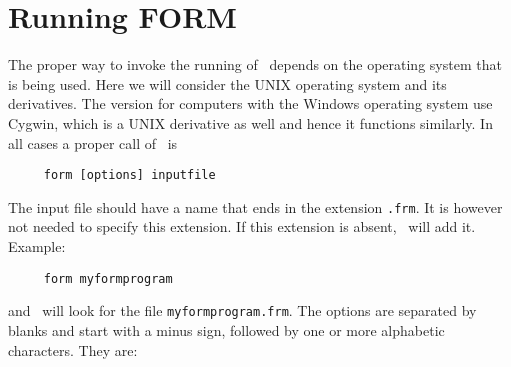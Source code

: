 \chapter{Running FORM}
\label{running}

The proper way to invoke the running of \FORM\ depends on 
the operating system that is being used. Here we will consider the 
UNIX operating system and its derivatives. The version for 
computers with the Windows operating system use Cygwin, which 
is a UNIX derivative as well and hence it functions similarly. In all cases 
a proper call of \FORM\ is
\begin{verbatim}
     form [options] inputfile
\end{verbatim}
The input file should have a name that ends in the 
extension \verb:.frm:. It is however not needed to specify this extension. 
If this extension is absent, \FORM\ will add it. Example:
\begin{verbatim}
     form myformprogram
\end{verbatim}
and \FORM\ will look for the file \verb:myformprogram.frm:. The options are 
separated by blanks and start with a minus sign, followed by one or more 
alphabetic characters. They are:
